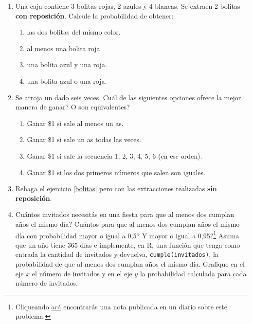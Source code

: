 \documentclass[11pt,a4paper,twoside]{article}%
\begin{document}
\begin{enumerate}
\item \label{bolitas} Una caja contiene 3 bolitas rojas, 2 azules y 4 blancas. Se extraen 2
bolitas \textbf{con reposici\'{o}n}. Calcule la probabilidad de
obtener:\vspace{-0.1cm}

\begin{enumerate}
\item las dos bolitas del mismo color.
\item al menos una bolita roja.
\item una bolita azul y una roja.
\item una bolita azul o una roja.
\end{enumerate}

\item Se arroja un dado seis veces. \textquestiondown Cu\'{a}l de las
siguientes opciones ofrece la mejor manera de ganar? \textquestiondown O son
equivalentes?\vspace{-0.15cm}

\begin{enumerate}
\item Ganar \$1 si sale al menos un as.

\item Ganar \$1 si sale un as todas las veces.

\item Ganar \$1 si sale la secuencia 1, 2, 3, 4, 5, 6 (en ese orden).

\item Ganar \$1 si los dos primeros n\'{u}meros que salen son iguales.
\end{enumerate}


\item Rehaga el ejercicio \ref{bolitas} pero con las extracciones realizadas \textbf{sin
reposici\'{o}n}.


\item \textquestiondown Cu\'antos invitados necesit\'as en una fiesta para que al menos dos cumplan a\~nos el mismo d\'ia? \textquestiondown Cu\'antos para que al menos dos cumplan a\~nos el mismo d\'ia con probabilidad mayor o igual a 0,5? \textquestiondown Y mayor o igual a 0,95?\footnote{Cliqueando \hyperlink{https://www.lanacion.com.ar/sociedad/desafio-que-es-paradoja-del-cumpleanos-nid2340525}{ac\'a} encontrar\'as una nota publicada en un diario sobre este problema.} Asuma que un a\~no tiene 365 d\'ias e implemente, en R, una funci\'on que tenga como entrada la cantidad de invitados y devuelva, \verb|cumple(invitados)|, la probabilidad de que al menos dos cumplan a\~nos el mismo d\'ia. Grafique en el eje $x$ el n\'umero de invitados y en el eje $y$ la probabilidad calculada para cada n\'umero de invitados.



\end{enumerate}
\end{document}
